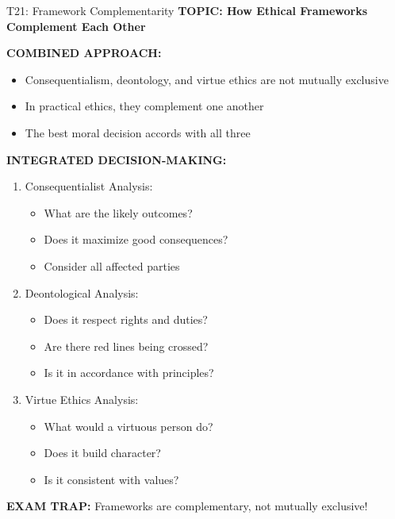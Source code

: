 \documentclass[8pt]{beamer}
\begin{document}
	\begin{frame}{T21: Framework Complementarity}
		\fontsize{6.5}{7.5}\selectfont
		\textbf{TOPIC: How Ethical Frameworks Complement Each Other}
		
		\vspace{0.1cm}
		\textbf{COMBINED APPROACH:}
		\begin{itemize}
			\item Consequentialism, deontology, and virtue ethics are not mutually exclusive
			\item In practical ethics, they complement one another
			\item The best moral decision accords with all three
		\end{itemize}
		
		\vspace{0.1cm}
		\textbf{INTEGRATED DECISION-MAKING:}
		\begin{enumerate}
			\item \textcolor{myblue}{Consequentialist Analysis:}
			\begin{itemize}
				\item What are the likely outcomes?
				\item Does it maximize good consequences?
				\item Consider all affected parties
			\end{itemize}
			\item \textcolor{myblue}{Deontological Analysis:}
			\begin{itemize}
				\item Does it respect rights and duties?
				\item Are there red lines being crossed?
				\item Is it in accordance with principles?
			\end{itemize}
			\item \textcolor{myblue}{Virtue Ethics Analysis:}
			\begin{itemize}
				\item What would a virtuous person do?
				\item Does it build character?
				\item Is it consistent with values?
			\end{itemize}
		\end{enumerate}
		
		\textcolor{myred}{\textbf{EXAM TRAP:}} Frameworks are \textcolor{myblue}{complementary, not mutually exclusive}!
	\end{frame}
	
\end{document}
